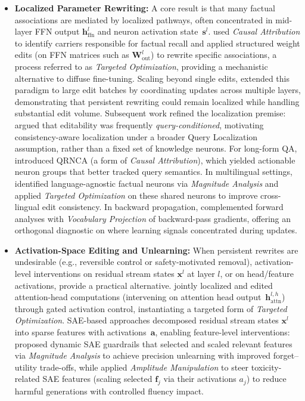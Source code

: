 \documentclass[11pt,letterpaper]{mystyle}
\begin{document}
  \begin{itemize}[leftmargin=*]
      \item \textbf{Localized Parameter Rewriting:}
      A core result is that many factual associations are mediated by localized pathways, often concentrated in mid-layer FFN output $\mathbf{h}_\text{ffn}^{l}$ and neuron activation state~$\mathbf{s}^l$. 
      \citet{meng2022ccs} used \textit{Causal Attribution} to identify carriers responsible for factual recall and applied structured weight edits (on FFN matrices such as $\mathbf{W}_{\text{out}}^l$) to rewrite specific associations, a process referred to as \textit{Targeted Optimization}, providing a mechanistic alternative to diffuse fine-tuning. 
      Scaling beyond single edits, \citet{meng2023massediting} extended this paradigm to large edit batches by coordinating updates across multiple layers, demonstrating that persistent rewriting could remain localized while handling substantial edit volume. 
      Subsequent work refined the localization premise: \citet{chen2024querylocalization} argued that editability was frequently \emph{query-conditioned}, motivating consistency-aware localization under a broader Query Localization assumption, rather than a fixed set of knowledge neurons. 
      For long-form QA, \citet{chen2024qrnca} introduced QRNCA (a form of \textit{Causal Attribution}), which yielded actionable neuron groups that better tracked query semantics. 
      In multilingual settings, \citet{zhang2024lulafns} identified language-agnostic factual neurons via  \textit{Magnitude Analysis} and applied \textit{Targeted Optimization} on these shared neurons to improve cross-lingual edit consistency. 
      In backward propagation, \citet{katz2024backwardlens} complemented forward analyses with \textit{Vocabulary Projection} of backward-pass gradients, offering an orthogonal diagnostic on where learning signals concentrated during updates.
  
      \item \textbf{Activation-Space Editing and Unlearning:}
      When persistent rewrites are undesirable (e.g., reversible control or safety-motivated removal), activation-level interventions on residual stream states $\mathbf{x}^l$ at layer $l$, or on head/feature activations, provide a practical alternative. 
      \citet{lai2025jola} jointly localized and edited attention-head computations (intervening on attention head output~$\mathbf{h}^{l,h}_\text{attn}$) through gated activation control, instantiating a targeted form of \textit{Targeted Optimization}.
      SAE-based approaches decomposed residual stream states $\mathbf{x}^l$ into sparse features with activations~$\mathbf{a}$, enabling feature-level interventions:  
      \citet{muhamed2025dsg} proposed dynamic SAE guardrails that selected and scaled relevant features via \textit{Magnitude Analysis} to achieve precision unlearning with improved forget--utility trade-offs, while \citet{goyalBreakingBadTokens2025} applied \textit{Amplitude Manipulation} to steer toxicity-related SAE features (scaling selected $\mathbf{f}_j$ via their activations $a_j$) to reduce harmful generations with controlled fluency impact.
  \end{itemize}
  
\end{document}
